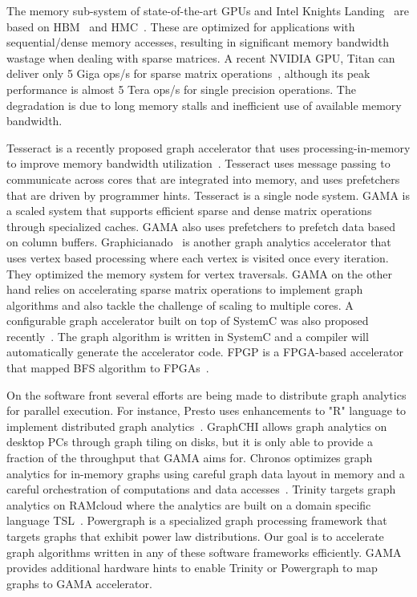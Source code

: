 \noindent
The memory sub-system of state-of-the-art GPUs and Intel Knights Landing~\cite{knight:intel:2016} 
are based on HBM~\cite{hbm} and HMC~\cite{hmc}. These are optimized for applications with sequential/dense memory accesses, resulting in significant memory bandwidth wastage when dealing with sparse matrices.
A recent NVIDIA GPU, Titan can deliver only 5 Giga ops/s for sparse matrix operations~\cite{liu2014efficient}, although its peak performance is almost 5 Tera ops/s for single precision operations. The  degradation is due to long memory stalls and inefficient use of available memory bandwidth.  

Tesseract is a recently proposed graph accelerator that uses processing-in-memory to improve memory bandwidth utilization~\cite{ahn2015scalable}.  Tesseract uses message passing to communicate across cores that are integrated into memory, and uses  prefetchers that are driven by programmer hints. Tesseract  is a single node system. GAMA is a scaled system that supports efficient sparse and dense matrix operations through specialized caches. GAMA also uses prefetchers to prefetch data based on column buffers. Graphicianado~\cite{Ham2016}  is another graph analytics accelerator that uses vertex based processing  where each vertex is visited once every iteration. They optimized the memory system for vertex traversals. GAMA on the other hand relies on accelerating sparse matrix operations to implement graph algorithms and also tackle the challenge of scaling to multiple cores. A configurable graph accelerator built on top of SystemC was also proposed recently~\cite{ozdal2016energy}. The graph algorithm is written in SystemC and a compiler will automatically generate the accelerator code. FPGP is a FPGA-based accelerator that mapped BFS algorithm to FPGAs~\cite{dai2016fpgp}. 

On the software front several efforts are being made to distribute graph analytics for parallel execution. For instance, Presto uses enhancements to "R" language to implement distributed graph analytics~\cite{venkataraman2013presto}. GraphCHI allows graph analytics on desktop PCs through graph tiling on disks, but it is only able to provide a fraction of the throughput that GAMA aims for. Chronos optimizes graph analytics for in-memory graphs using careful graph data layout in memory and a careful orchestration of computations and data accesses~\cite{han2014chronos}. Trinity targets graph analytics on RAMcloud where the analytics are built on a domain specific language TSL~\cite{shao2013trinity}. Powergraph is a specialized graph processing framework that targets graphs that exhibit power law distributions. Our goal is to accelerate graph algorithms written in any of these software frameworks efficiently. GAMA provides additional hardware hints to enable Trinity or Powergraph to map graphs to GAMA accelerator. 

